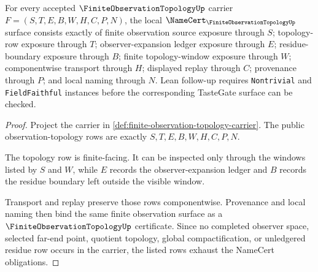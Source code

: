 \begin{theorem}
\label{thm:finite-observation-topology-namecert-obligations}
For every accepted $\FiniteObservationTopologyUp$ carrier $F=(S,T,E,B,W,H,C,P,N)$, the local $\NameCert_{\FiniteObservationTopologyUp}$ surface consists exactly of finite observation source exposure through $S$; topology-row exposure through $T$; observer-expansion ledger exposure through $E$; residue-boundary exposure through $B$; finite topology-window exposure through $W$; componentwise transport through $H$; displayed replay through $C$; provenance through $P$; and local naming through $N$. Lean follow-up requires \texttt{Nontrivial} and \texttt{FieldFaithful} instances before the corresponding TasteGate surface can be checked.
\end{theorem}
\begin{proof}
Project the carrier in \autoref{def:finite-observation-topology-carrier}. The public observation-topology rows are exactly $S,T,E,B,W,H,C,P,N$.

The topology row is finite-facing. It can be inspected only through the windows listed by $S$ and $W$, while $E$ records the observer-expansion ledger and $B$ records the residue boundary left outside the visible window.

Transport and replay preserve those rows componentwise. Provenance and local naming then bind the same finite observation surface as a $\FiniteObservationTopologyUp$ certificate. Since no completed observer space, selected far-end point, quotient topology, global compactification, or unledgered residue row occurs in the carrier, the listed rows exhaust the NameCert obligations.
\end{proof}



